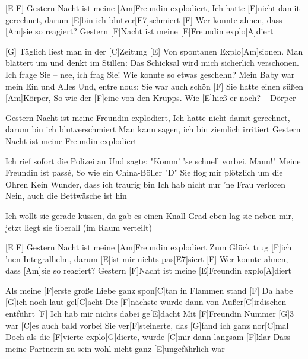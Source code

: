 

\begin{guitar}
	\begin{highlightbar}
		[E F] Gestern Nacht ist meine [Am]Freundin explodiert,
		Ich hatte [F]nicht damit gerechnet, darum [E]bin ich blutver[E7]schmiert
		[F] Wer konnte ahnen, dass [Am]sie so reagiert?
		Gestern [F]Nacht ist meine [E]Freundin explo[A]diert
	\end{highlightbar}
	
	\songsection{Strophe 1}
	[G] Täglich liest man in der [C]Zeitung 
	[E] Von spontanen Explo[Am]sionen. 
	Man blättert um und denkt im Stillen: 
	Das Schicksal wird mich sicherlich verschonen.
	Ich frage Sie – nee, ich frag Sie!
	Wie konnte so etwas geschehn?
	Mein Baby war mein Ein und Alles 
	Und, entre nous: Sie war auch schön
	[F] Sie hatte einen süßen [Am]Körper,
	So wie der [F]eine von den Krupps. Wie [E]hieß er noch? – Dörper
	
	\begin{highlightbar}
		\songsection{Refrain}
		Gestern Nacht ist meine Freundin explodiert,
		Ich hatte nicht damit gerechnet, darum bin ich blutverschmiert
		Man kann sagen, ich bin ziemlich irritiert
		Gestern Nacht ist meine Freundin explodiert
	\end{highlightbar}
	
	\songsection{Strophe 2}
	Ich rief sofort die Polizei an
	Und sagte: "Komm' 'se schnell vorbei, Mann!"
	Meine Freundin ist passé,
	So wie ein China-Böller "D"
	Sie flog mir plötzlich um die Ohren
	Kein Wunder, dass ich traurig bin
	Ich hab nicht nur ’ne Frau verloren
	Nein, auch die Bettwäsche ist hin
	
	Ich wollt sie gerade küssen, da gab es einen Knall
	Grad eben lag sie neben mir, jetzt liegt sie überall (im Raum verteilt)
	
	\begin{highlightbar}
		[E F] Gestern Nacht ist meine [Am]Freundin explodiert
		Zum Glück trug [F]ich ’nen Integralhelm, darum [E]ist mir nichts pas[E7]siert
		[F] Wer konnte ahnen, dass [Am]sie so reagiert?
		Gestern [F]Nacht ist meine [E]Freundin explo[A]diert
	\end{highlightbar}
	
	Als meine [F]erste große Liebe ganz spon[C]tan in Flammen stand
	[F] Da habe [G]ich noch laut gel[C]acht
	Die [F]nächste wurde dann von Außer[C]irdischen entführt
	[F] Ich hab mir nichts dabei ge[E]dacht
	Mit [F]Freundin Nummer [G]3 war [C]es auch bald vorbei
	Sie ver[F]steinerte, das [G]fand ich ganz nor[C]mal
	Doch als die [F]vierte explo[G]dierte, wurde [C]mir dann langsam [F]klar
	Dass meine Partnerin zu sein wohl nicht ganz [E]ungefährlich war
	

\end{guitar}
